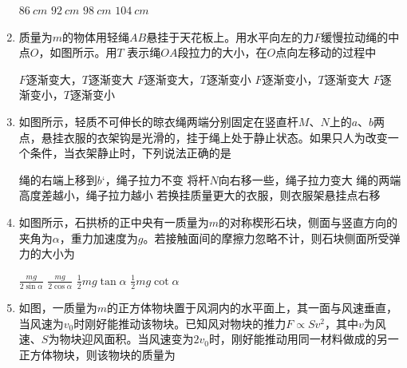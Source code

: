 \begin{enumerate}
\fourchoices
{$ 86 \ cm $}
{$ 92 \ cm $}
{$ 98 \ cm $ }
{$ 104 \ cm $}

\item 
{}
质量为$ m $的物体用轻绳$ AB $悬挂于天花板上。用水平向左的力$ F $缓慢拉动绳的中点$ O $，如图所示。用$ T $ 表示绳$ OA $段拉力的大小，在$ O $点向左移动的过程中  
\begin{figure}[h!]
\centering

\end{figure}


\fourchoices
{$ F $逐渐变大，$ T $逐渐变大}
{$ F $逐渐变大，$ T $逐渐变小}
{$ F $逐渐变小，$ T $逐渐变大}
{$ F $逐渐变小，$ T $逐渐变小}


\newpage	

\item 
{}
如图所示，轻质不可伸长的晾衣绳两端分别固定在竖直杆$ M $、$ N $上的$ a $、$ b $两点，悬挂衣服的衣架钩是光滑的，挂于绳上处于静止状态。如果只人为改变一个条件，当衣架静止时，下列说法正确的是  
\begin{figure}[h!]
\centering

\end{figure}


\fourchoices
{绳的右端上移到$ b‘	 $，绳子拉力不变}
{将杆$ N $向右移一些，绳子拉力变大}
{绳的两端高度差越小，绳子拉力越小}
{若换挂质量更大的衣服，则衣服架悬挂点右移}



\item 
{}
如图所示，石拱桥的正中央有一质量为$ m $的对称楔形石块，侧面与竖直方向的夹角为$ \alpha $，重力加速度为$ g $。若接触面间的摩擦力忽略不计，则石块侧面所受弹力的大小为  
\begin{figure}[h!]
\centering

\end{figure}

\fourchoices
{$ \frac { m g } { 2 \sin \alpha } $}
{$ \frac { m g } { 2 \cos \alpha } $}
{$ \frac { 1 } { 2 } m g \tan \alpha $}
{$ \frac { 1 } { 2 } m g \cot \alpha $}




\item 
{}
如图，一质量为$ m $的正方体物块置于风洞内的水平面上，其一面与风速垂直，当风速为$ v_{0} $时刚好能推动该物块。已知风对物块的推力$ F \propto Sv^2 $，其中$ v $为风速、$ S $为物块迎风面积。当风速变为$ 2v_0 $时，刚好能推动用同一材料做成的另一正方体物块，则该物块的质量为  



\end{enumerate}
